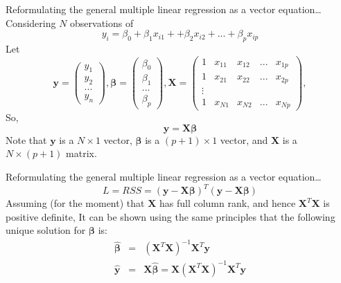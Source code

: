 \documentclass[aspectratio=169]{beamer}
\let \vec \mathbf
\begin{document}
    \begin{frame}{Reformulating the general multiple linear regression as a vector equation…}
    Considering $N$ observations of
    \begin{equation*}
        y_i = \beta_0 + \beta_1 x_{i1} + + \beta_2 x_{i2} + ... + \beta_p x_{ip}
    \end{equation*}
    Let
    \begin{equation*}
        \vec{y} = \begin{pmatrix}y_1\\y_2\\...\\y_n\end{pmatrix}, \bm{\beta} = \begin{pmatrix}\beta_0\\\beta_1\\...\\\beta_p\end{pmatrix}, \vec{X} = \begin{pmatrix}1 & x_{11} & x_{12} & ... & x_{1p}\\
        1 & x_{21} & x_{22} & ... & x_{2p}\\
        \vdots & & & & \\
        1 & x_{N1} & x_{N2} & ... & x_{Np}\end{pmatrix}, 
    \end{equation*}
    So, 
    \begin{equation*}
        \vec{y} = \vec{X}\bm{\beta} 
    \end{equation*}
    Note that $\vec{y}$ is a $N \times 1$ vector,
    $\bm{\beta}$ is a $(p+1) \times 1$ vector, and $\vec{X}$ is a  $N \times (p+1)$ matrix.
\end{frame}


\begin{frame}{Reformulating the general multiple linear regression as a vector equation…}
    \begin{equation*}
        L = RSS = (\vec{y} - \vec{X}\bm{\beta})^T(\vec{y} - \vec{X}\bm{\beta})
    \end{equation*}
    Assuming (for the moment) that $\vec{X}$ has full column rank, and hence $\vec{X}^T\vec{X}$ is positive definite, It can be shown using the same principles that the following unique solution for $\bm{\beta}$ is:
    \begin{eqnarray*}
        \hat{\bm{\beta}} &=& (\vec{X}^T \vec{X})^{-1} \vec{X}^T \vec{y} \\
        \hat{\vec{y}} & = & \vec{X} \hat{\bm{\beta}} = \vec{X}(\vec{X}^T \vec{X})^{-1} \vec{X}^T \vec{y} 
    \end{eqnarray*}
\end{frame}
\end{document}
